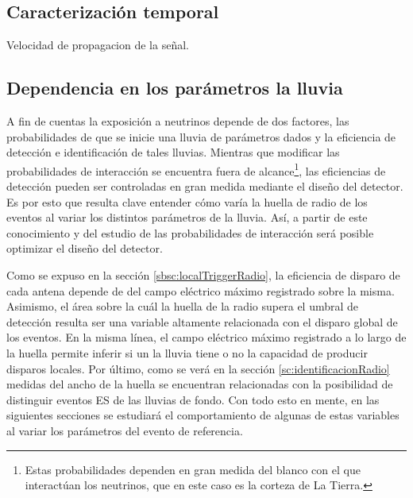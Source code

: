 	
% 		
% 	
% 	
% 	
% 	
% 		
	\clearpage
	
	\subsection{Caracterizaci\'on temporal}
	
	Velocidad de propagacion de la se\~nal.
	
	\subsection{Dependencia en los par\'ametros la lluvia}
	
	A fin de cuentas la exposici\'on a neutrinos depende de dos factores, las probabilidades de que se inicie una lluvia de par\'ametros dados y la eficiencia de detecci\'on e identificaci\'on de tales lluvias.
	Mientras que modificar las probabilidades de interacci\'on se encuentra fuera de alcance\footnote{Estas probabilidades dependen en gran medida del blanco con el que interact\'uan los neutrinos, que en este caso es la corteza de La Tierra.}, las eficiencias de detecci\'on pueden ser controladas en gran medida mediante el dise\~no del detector. 
	Es por esto que resulta clave entender c\'omo var\'ia la huella de radio de los eventos al variar los distintos par\'ametros de la lluvia.
	As\'i, a partir de este conocimiento y del estudio de las probabilidades de interacci\'on ser\'a posible optimizar el dise\~no del detector.
	
	Como se expuso en la secci\'on \ref{sbsc:localTriggerRadio}, la eficiencia de disparo de cada antena depende de del campo el\'ectrico m\'aximo registrado sobre la misma.
	Asimismo, el \'area sobre la cu\'al la huella de la radio supera el umbral de detecci\'on resulta ser una variable altamente relacionada con el disparo global de los eventos.
	En la misma l\'inea, el campo el\'ectrico m\'aximo registrado a lo largo de la huella permite inferir si un la lluvia tiene o no la capacidad de producir disparos locales.
	Por \'ultimo, como se ver\'a en la secci\'on \ref{sc:identificacionRadio} medidas del ancho de la huella se encuentran relacionadas con la posibilidad de distinguir eventos ES de las lluvias de fondo.
	Con todo esto en mente, en las siguientes secciones se estudiar\'a el comportamiento de algunas de estas variables al variar los par\'ametros del evento de referencia.
	
